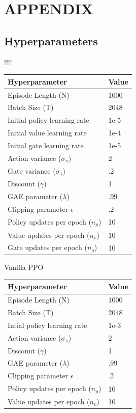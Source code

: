 \documentclass[letterpaper, 10 pt, conference]{ieeeconf}
\begin{document}




\section*{APPENDIX}

\subsection*{Hyperparameters}

\begin{center}
!!!!

\begin{tabu}{ X[2,l] | X[1,l] }
Hyperparameter & Value \\
 \hline
 Episode Length (N) & 1000  \\ 
 Batch Size (T) & 2048  \\ 
 Initial policy learning rate & 1e-5  \\ 
 Initial value learning rate & 1e-4  \\ 
 Initial gate learning rate & 1e-5  \\ 
 Action variance ($\sigma_{\pi}$) & 2 \\
 Gate variance ($\sigma_{\gamma}$) & .2 \\
 Discount ($\gamma$)   & 1 \\
 GAE parameter ($\lambda$)  & .99 \\
 Clipping parameter $\epsilon$ & .2 \\
 Policy updates per epoch ($n_{p}$) & 10 \\
 Value updates  per epoch ($n_{v}$) & 10\\
 Gate updates   per epoch ($n_{g}$) & 10\\
 \hline
\end{tabu}
\end{center}

\begin{center}
Vanilla PPO
\begin{tabu}{ X[2,l] | X[1,l] }
Hyperparameter & Value \\
 \hline
 Episode Length (N) & 1000  \\ 
 Batch Size (T) & 2048  \\ 
 Intial policy learning rate & 1e-3  \\ 
 Action variance ($\sigma_{\pi}$) & 2 \\
 Discount ($\gamma$)   & 1 \\
 GAE parameter ($\lambda$)  & .99 \\
 Clipping parameter $\epsilon$ & .2 \\
 Policy updates per epoch ($n_{p}$) & 10 \\
 Value updates per epoch ($n_{v}$) & 10\\
 \hline
\end{tabu}
\end{center}
\end{document}
